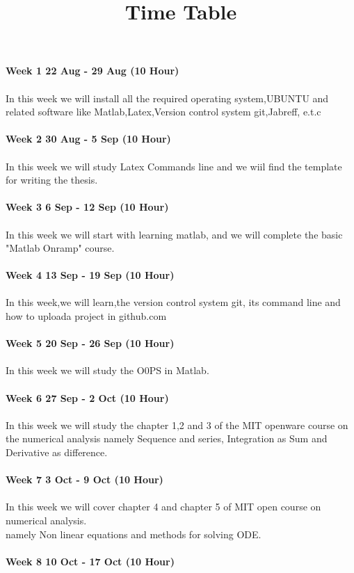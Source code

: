 \documentclass{article}
\begin{document}
\title{Time Table}
\maketitle
\author{}
\textbf{Week 1  22 Aug - 29 Aug (10 Hour)}\\ \\
In this week we will install all the required operating system,UBUNTU and related software 
like Matlab,Latex,Version control system git,Jabreff, e.t.c\\ \\
\textbf{Week 2 30 Aug - 5 Sep (10 Hour)}\\ \\
In this week we will study Latex Commands line and we wiil find the template for writing the 
 thesis.\\ \\
\textbf{Week 3 6 Sep - 12 Sep (10 Hour)} \\ \\
In this week we will start with learning matlab, and we will complete the basic "Matlab Onramp"
course.\\ \\
\textbf{Week 4 13 Sep - 19 Sep (10 Hour)} \\ \\
In this week,we will learn,the version control system git, its command line and how to uploada project in github.com\\ \\
\textbf{Week 5 20 Sep - 26 Sep (10 Hour)}\\ \\
In this week we will study the O0PS in Matlab.\\ \\
\textbf{Week 6 27 Sep - 2 Oct (10 Hour)} \\ \\
In this week we will study the chapter 1,2 and 3 of the MIT openware course on the numerical 
analysis namely Sequence and series, Integration as Sum and Derivative as difference.\\ \\
\textbf{Week 7 3 Oct - 9 Oct (10 Hour)}\\ \\
In this week we will cover chapter 4 and chapter 5 of MIT open course on numerical analysis.\\ 
namely Non linear equations and methods for solving ODE.\\ \\
\textbf{Week  8 10 Oct - 17 Oct (10 Hour)}\\ \\
\end{document}
